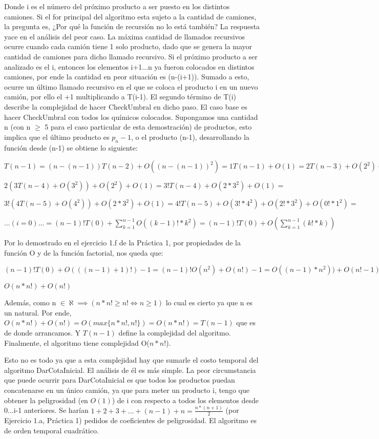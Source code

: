 Donde i es el número del próximo producto a ser puesto en los distintos camiones. Si el for principal del algoritmo esta sujeto a la cantidad de camiones, la pregunta es, ¿Por qué la función de recursión no lo está también? La respuesta yace en el análisis del peor caso. La máxima cantidad de llamados recursivos ocurre cuando cada camión tiene 1 solo producto, dado que se genera la mayor cantidad de camiones para dicho llamado recursivo. Si el próximo producto a ser analizado es el i, entonces los elementos i+1...n ya fueron colocados en distintos camiones, por ende la cantidad en peor situación es (n-(i+1)). Sumado a esto, ocurre un último llamado recursivo en el que se coloca el producto i en un nuevo camión, por ello el +1 multiplicando a T(i-1). El segundo término de T(i) describe la complejidad de hacer CheckUmbral en dicho paso. El caso base es hacer CheckUmbral con todos los químicos colocados.\newline
\indent Supongamos una cantidad n (con n $\geq$ 5 para el caso particular de esta demostración) de productos, esto implica que el último producto es $p_n-1$, o el producto (n-1), desarrollando la función desde (n-1) se obtiene lo siguiente:

$T(n-1) = (n-(n-1))T(n-2) + O((n-(n-1))^2) = 1T(n-1) + O(1) = 2T(n-3) + O(2^2) + O(1) = $

$2(3T(n-4) + O(3^2)) + O(2^2) + O(1) = 3!T(n-4) + O(2*3^2) + O(1) = $

$3!(4T(n-5) + O(4^2)) + O(2*3^2) + O(1) = 4!T(n-5) + O(3!*4^2) + O(2!*3^2) + O(0!*1^2) =$

$...(i = 0)... = (n-1)!T(0) + \sum\limits_{k=1}^{n-1} O((k-1)!*k^2) = (n-1)!T(0) + O(\sum\limits_{k=1}^{n-1} (k!*k))$

Por lo demostrado en el ejercicio 1.f de la Práctica 1, por propiedades de la función O y de la función factorial, nos queda que:

$(n-1)!T(0) + O(((n-1)+1)!) - 1 = (n-1)!O(n^2) + O(n!) - 1 = O((n-1)*n^2)) + O(n! - 1) =$

$O(n*n!) + O(n!)$

Además, como n $\in \aleph \implies ( n*n! \geq n! \iff n \geq 1)$ lo cual es cierto ya que n es un natural.
Por ende, $O(n*n!) + O(n!) = O(max\{n*n!,n!\}) = O(n*n!) = T(n-1)$ que es de donde arrancamos. Y $T(n-1)$ define la complejidad del algoritmo. Finalmente, el algoritmo tiene complejidad O($n*n!$). 

Esto no es todo ya que a esta complejidad hay que sumarle el costo temporal del algoritmo Dar\textunderscore Cota\textunderscore Inicial. El análisis de él es más simple. La peor circumstancia que puede ocurrir para Dar\textunderscore Cota\textunderscore Inicial es que todos los productos puedan concatenarse en un único camión, ya que para meter un producto i, tengo que obtener la peligrosidad (en $O(1)$) de i con respecto a todos los elementos desde 0...i-1 anteriores. Se harían $1 + 2 + 3 + ... + (n-1) + n = \frac{n * (n+1)}{2}$ (por Ejercicio 1.a, Práctica 1) pedidos de coeficientes de peligrosidad. El algoritmo es de orden temporal cuadrático.

